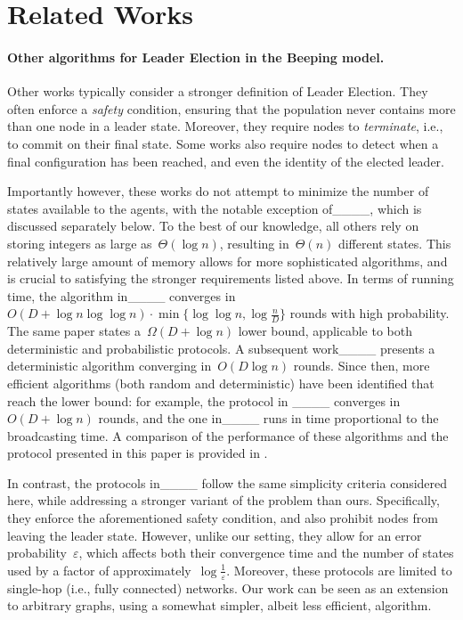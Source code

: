 \section{Related Works}
\label{sec:related_works}


\paragraph{Other algorithms for Leader Election in the Beeping model.}

Other works typically consider
a stronger definition of Leader Election. They often enforce a {\em safety} condition, ensuring that the population never contains more than one node in a leader state. Moreover, they require nodes to {\em terminate}, i.e., to commit on their final state. Some works also require nodes to detect when a final configuration has been reached, and even the identity of the elected leader.

Importantly however, these works do not attempt to minimize the number of states available to the agents, with the notable exception of____, which is discussed separately below. To the best of our knowledge, all others rely on storing integers as large as~$\Theta(\log n)$, resulting in~$\Theta(n)$ different states. This relatively large amount of memory allows for more sophisticated algorithms, and is crucial to satisfying the stronger requirements listed above.
In terms of running time, the algorithm in____ converges in~$O(D + \log n \log \log n) \cdot \min \{ \log \log n, \log \frac{n}{D} \}$ rounds with high probability.
The same paper states a~$\Omega(D + \log n)$ lower bound, applicable to both deterministic and probabilistic protocols.
A subsequent work____ presents a deterministic algorithm converging in~$O(D \log n)$ rounds.
Since then, more efficient algorithms (both random and deterministic) have been identified that reach the lower bound: for example, the protocol in ____ converges in~$O(D + \log n)$ rounds, and the one in____ runs in time proportional to the broadcasting time. A comparison of the performance of these algorithms and the protocol presented in this paper is provided in .

In contrast, the protocols in____ follow the same simplicity criteria considered here, while addressing a stronger variant of the problem than ours. Specifically, they enforce the aforementioned safety condition, and also prohibit nodes from leaving the leader state. However, unlike our setting, they allow for an error probability~$\varepsilon$, which affects both their convergence time and the number of states used by a factor of approximately~$\log \frac{1}{\varepsilon}$. Moreover, these protocols are limited to single-hop (i.e., fully connected) networks.
Our work can be seen as an extension to arbitrary graphs, using a somewhat simpler, albeit less efficient, algorithm.

